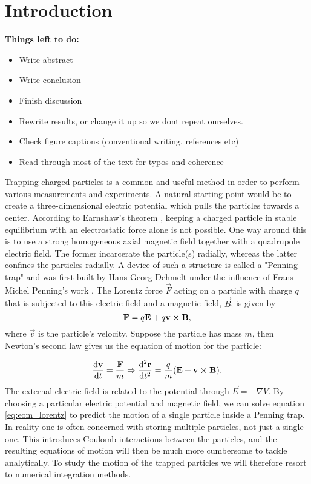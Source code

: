 \section{Introduction}\label{sec:introduction}


\textbf{Things left to do:}
\begin{itemize}
    \item Write abstract
    \item Write conclusion
    \item Finish discussion
    \item Rewrite results, or change it up so we dont repeat ourselves. 
    \item Check figure captions (conventional writing, references etc)
    \item Read through most of the text for typos and coherence
\end{itemize}


Trapping charged particles is a common and useful method in order to perform various measurements and experiments. A natural starting point would be to create a three-dimensional electric potential which pulls the particles towards a center. According to Earnshaw's theorem \citep{GriffithsEarnshaw}, keeping a charged particle in stable equilibrium with an electrostatic force alone is not possible. One way around this is to use a strong homogeneous axial magnetic field together with a quadrupole electric field. The former incarcerate the particle(s) radially, whereas the latter confines the particles radially. A device of such a structure is called a "Penning trap" and was first built by Hans Georg Dehmelt under the influence of Frans Michel Penning's work \citep{Dehmelt1989}. The Lorentz force $\vec{F}$ acting on a particle with charge $q$ that is subjected to this electric field and a magnetic field, $\vec{B}$, is given by 
\begin{equation}\label{eq:lorentz_force}
    \mathbf{F} = q\mathbf{E} + q \mathbf{v} \cross \mathbf{B},
\end{equation}
where $\vec{v}$ is the particle's velocity. Suppose the particle has mass $m$, then Newton's second law gives us the equation of motion for the particle:

\begin{equation}\label{eq:eom_lorentz}
 \dv{\mathbf{v}}{t} = \frac{\mathbf{F}}{m}  \Rightarrow \dv[2]{\mathbf{r}}{t}= \frac{q}{m} (\mathbf{E} + \mathbf{v} \cross \mathbf{B} ).
\end{equation}
The external electric field is related to the potential through $\vec{E} = -\nabla V$. By choosing a particular electric potential and magnetic field, we can solve equation \eqref{eq:eom_lorentz} to predict the motion of a single particle inside a Penning trap. In reality one is often concerned with storing multiple particles, not just a single one. This introduces Coulomb interactions between the particles, and the resulting equations of motion will then be much more cumbersome to tackle analytically. To study the motion of the trapped particles we will therefore resort to numerical integration methods. 

